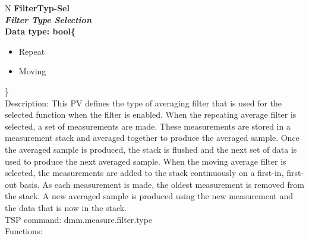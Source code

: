 \documentclass[openany]{article}
\begin{document}
		\begin{tabular}{N}
			\hline
			\bfseries FilterTyp-Sel\label{pv:filtertyp-sel} \\ \hline
			\emph{Filter Type Selection} \\
			Data type: bool\{\begin{itemize}[noitemsep]
				\item[] Repeat
				\item[] Moving
			\end{itemize}\} \\
			Description: This PV defines the type of averaging filter that is used for the selected function when the filter is enabled. When the repeating average filter is selected, a set of measurements are made. These measurements are stored in a measurement stack and averaged together to produce the averaged sample. Once the averaged sample is produced, the stack is flushed and the next set of data is used to produce the next averaged sample. When the moving average filter is selected, the measurements are added to the stack continuously on a first-in, first-out basis. As each measurement is made, the oldest measurement is removed from the stack. A new averaged sample is produced using the new measurement and the data that is now in the stack. \\
			TSP command: dmm.measure.filter.type \\
			Functions: \\
			\arrayrulecolor{\FuncTableBorderColor}

		\end{tabular}
\end{document}
